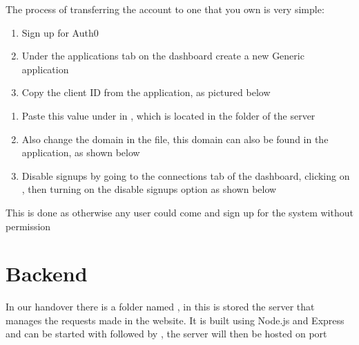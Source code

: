 \documentclass[letterpaper,10pt,english]{sphinxmanual}
\let\sphinxpxdimen\pdfpxdimen\else\newdimen\sphinxpxdimen
\begin{document}
The process of transferring the account to one that you own is very
simple:
\begin{enumerate}
%
\item {} 
Sign up for Auth0 

\item {} 
Under the applications tab on the dashboard create a new Generic
application

\item {} 
Copy the client ID from the application, as pictured below

\end{enumerate}

\noindent\sphinxincludegraphics[width=300\sphinxpxdimen]{{auth0}.png}
\begin{enumerate}
%
\setcounter{enumi}{3}
\item {} 
Paste this value under  in , which is
located in the  folder of the  server

\item {} 
Also change the domain in the  file, this domain
can also be found in the application, as shown below

\item {} 
Disable signups by going to the connections tab of the dashboard,
clicking on , then turning on the
disable signups option as shown below

\end{enumerate}

This is done as otherwise any user could come and sign up for the system
without permission


\section{Backend}
\label{\detokenize{docs/Installation/backEnd:backend}}\label{\detokenize{docs/Installation/backEnd::doc}}
In our handover there is a folder named , in this is stored
the server that manages the requests made in the website. It is built
using Node.js and Express and can be started with 
followed by , the server will then be hosted on port
\end{document}
